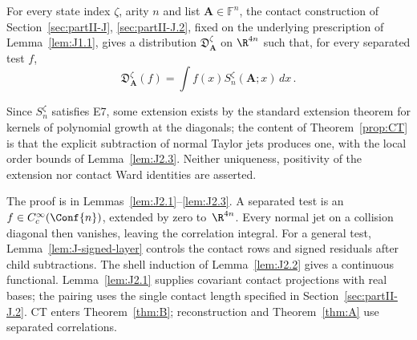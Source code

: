 \begin{theorem}\label{prop:CT}
For every state index $\zeta$, arity $n$ and list $\boldsymbol A\in\mathbb F^n$, the contact construction of Section~\ref{sec:partII-J}, \ref{sec:partII-J.2}, fixed on the underlying prescription of Lemma~\ref{lem:J1.1}, gives a distribution $\mathfrak D_{\boldsymbol A}^\zeta$ on $\R^{4n}$ such that, for every separated test $f$,
\begin{equation*}
\mathfrak D_{\boldsymbol A}^\zeta(f)=\int f(x)S_n^\zeta(\boldsymbol A;x)\,dx\,.
\end{equation*}
\end{theorem}

Since $S_n^\zeta$ satisfies E7, some extension exists by the standard extension theorem for kernels of polynomial growth at the diagonals; the content of Theorem~\ref{prop:CT} is that the explicit subtraction of normal Taylor jets produces one, with the local order bounds of Lemma~\ref{lem:J2.3}. Neither uniqueness, positivity of the extension nor contact Ward identities are asserted.

The proof is in Lemmas~\ref{lem:J2.1}--\ref{lem:J2.3}. A separated test is an $f\in C_c^\infty(\Conf{n})$, extended by zero to~$\R^{4n}$. Every normal jet on a collision diagonal then vanishes, leaving the correlation integral. For a general test, Lemma~\ref{lem:J-signed-layer} controls the contact rows and signed residuals after child subtractions. The shell induction of Lemma~\ref{lem:J2.2} gives a continuous functional. Lemma~\ref{lem:J2.1} supplies covariant contact projections with real bases; the pairing uses the single contact length specified in Section~\ref{sec:partII-J.2}. CT enters Theorem~\ref{thm:B}; reconstruction and Theorem~\ref{thm:A} use separated correlations.
